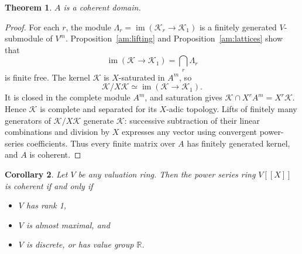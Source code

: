 \documentclass[12pt]{amsart}
\newtheorem{theorem}{Theorem}[section]
\newtheorem{corollary}[theorem]{Corollary}
\theoremstyle{plain}
\begin{document}
\begin{theorem}\label{thm: coherence}
$A$ is a coherent domain.    
\end{theorem}

\begin{proof} For each $r$, the module
$\Lambda_r=\operatorname{im}(\mathcal K_r\to\mathcal K_1)$
is a finitely generated $V$-submodule of $V^m$.
Proposition~\ref{am:lifting} and Proposition~\ref{am:lattices} show that
\[
\operatorname{im}(\mathcal K\to\mathcal K_1)=\bigcap_r\Lambda_r
\]
is finite free. The kernel $\mathcal K$ is $X$-saturated in $A^m$,
so
\[
\mathcal K/X\mathcal K
\simeq\operatorname{im}(\mathcal K\to\mathcal K_1).
\]
It is closed in the complete module $A^m$, and saturation gives
$\mathcal K\cap X^rA^m=X^r\mathcal K$. Hence $\mathcal K$ is complete
and separated for its $X$-adic topology. Lifts of finitely many
generators of $\mathcal K/X\mathcal K$ generate $\mathcal K$:
successive subtraction of their linear combinations and division by
$X$ expresses any vector using convergent power-series coefficients.
Thus every finite matrix over $A$ has finitely generated kernel, and
$A$ is coherent.\end{proof}

\begin{corollary}\label{cor: conditions for coherence}
Let $V$ be any valuation ring. Then the power series ring $V[[X]]$ is coherent if and only if

\begin{itemize}
    \item $V$ has rank 1,

    \item $V$ is almost maximal, and

    \item $V$ is discrete, or has value group $\mathbb{R}$.
\end{itemize}
\end{corollary}
\end{document}
